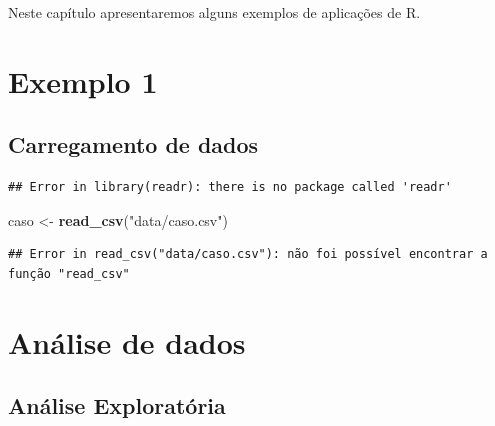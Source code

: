 \documentclass[
]{book}
\newenvironment{Shaded}{\begin{snugshade}}{\end{snugshade}}
\newcommand{\CommentTok}[1]{\textcolor[rgb]{0.56,0.35,0.01}{\textit{#1}}}
\newcommand{\KeywordTok}[1]{\textcolor[rgb]{0.13,0.29,0.53}{\textbf{#1}}}
\newcommand{\NormalTok}[1]{#1}
\newcommand{\StringTok}[1]{\textcolor[rgb]{0.31,0.60,0.02}{#1}}
\begin{document}
Neste capítulo apresentaremos alguns exemplos de
aplicações de R.

\hypertarget{exemplo-1}{%
\section{Exemplo 1}\label{exemplo-1}}

\hypertarget{carregamento-de-dados}{%
\subsection{Carregamento de dados}\label{carregamento-de-dados}}

\begin{Shaded}
\end{Shaded}

\begin{verbatim}
## Error in library(readr): there is no package called 'readr'
\end{verbatim}

\begin{Shaded}
\begin{Highlighting}[]
\NormalTok{caso <-}\StringTok{ }\KeywordTok{read_csv}\NormalTok{(}\StringTok{"data/caso.csv"}\NormalTok{)}
\end{Highlighting}
\end{Shaded}

\begin{verbatim}
## Error in read_csv("data/caso.csv"): não foi possível encontrar a função "read_csv"
\end{verbatim}

\hypertarget{anuxe1lise-de-dados}{%
\section{Análise de dados}\label{anuxe1lise-de-dados}}

\hypertarget{anuxe1lise-exploratuxf3ria}{%
\subsection{Análise Exploratória}\label{anuxe1lise-exploratuxf3ria}}
\end{document}
